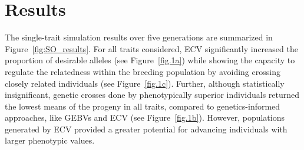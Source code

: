 \documentclass[12pt, a4paper, bibliography=totoc]{scrartcl}
\newcommand{\pouya}[1]{{\color{orange} #1}}
\newcommand{\alert}{\textcolor{red}}
\begin{document}
\section*{Results}\label{sec:results}

The single-trait simulation results over five generations are summarized in Figure~\ref{fig:SO_results}. For all traits considered, ECV significantly increased the proportion of desirable alleles (see Figure~\ref{fig.1a}) while showing the capacity to regulate the relatedness within the breeding population by avoiding crossing closely related individuals (see Figure~\ref{fig.1c}). Further, although statistically insignificant, genetic crosses done by phenotypically superior individuals returned the lowest means of the progeny in all traits, compared to genetics-informed approaches, like GEBVs and ECV (see Figure~\ref{fig.1b}). However, populations generated by ECV provided a greater potential for advancing individuals with larger phenotypic values.   




\end{document}
